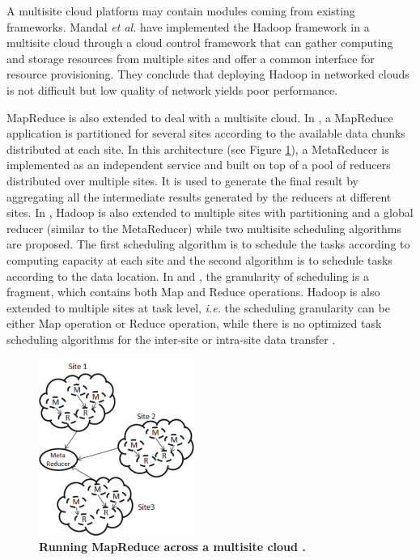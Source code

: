 A multisite cloud platform may contain modules coming from
existing frameworks. Mandal \textit{et al.} \cite{Mandal2011} have implemented
the Hadoop framework in a multisite cloud through a cloud control framework that can gather computing and storage resources from multiple sites and offer a common interface for resource provisioning. They conclude that deploying Hadoop
in networked clouds is not difficult but low quality of network
yields poor performance.

MapReduce is also extended to deal with a multisite cloud. In \cite{Tudoran2012}, a MapReduce application is partitioned for several sites according to the available data chunks distributed at each site. In this architecture (see Figure \ref{fig:f16}), a MetaReducer is implemented as an independent service and built on top of a pool of reducers distributed over multiple sites. It is used to generate the final result by aggregating all the intermediate results generated by the reducers at different sites. In \cite{Luo2012}, Hadoop is also extended to multiple sites with partitioning and a global reducer (similar to the MetaReducer) while two multisite scheduling algorithms are proposed. The first scheduling algorithm is to schedule the tasks according to computing capacity at each site and the second algorithm is to schedule tasks according to the data location. In \cite{Tudoran2012} and \cite{Luo2012}, the granularity of scheduling is a fragment, which contains both Map and Reduce operations. Hadoop is also extended to multiple sites at task level, \textit{i.e.} the scheduling granularity can be either Map operation or Reduce operation, while there is no optimized task scheduling algorithms for the inter-site or intra-site data transfer \cite{Wang2013}. 




\begin{figure}
\begin{centering}
\includegraphics[width=2in]{figures/f16}
\par\end{centering}

\caption{\textbf{Running MapReduce across a multisite cloud \cite{Tudoran2012}. }}
\label{fig:f16} 
\end{figure}


